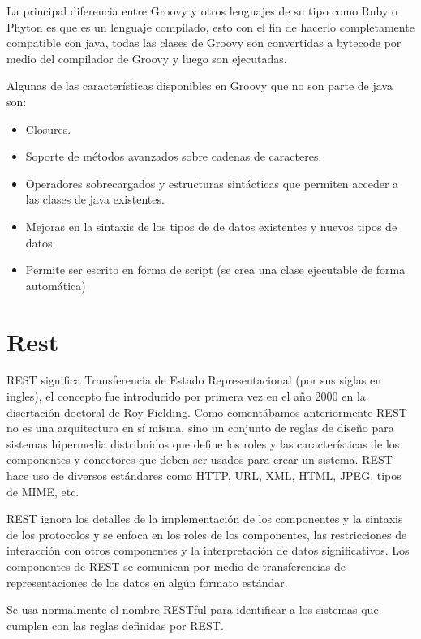 \documentclass[12pt,a4paper,spanish,openany]{book}
\begin{document}
La principal diferencia entre Groovy y otros lenguajes de su tipo como Ruby
o Phyton es que es un lenguaje compilado, esto con el fin de hacerlo
completamente compatible con java, todas las clases de Groovy son convertidas a
bytecode por medio del compilador de Groovy y luego son ejecutadas.

Algunas de las características disponibles en Groovy que no son parte de java
son:

\begin{itemize}
  \item Closures.
  \item Soporte de métodos avanzados sobre cadenas de caracteres.
  \item Operadores sobrecargados y estructuras sintácticas que permiten acceder
  a las clases de java existentes.
  \item Mejoras en la sintaxis de los tipos de de datos existentes y nuevos tipos
  de datos.
 \item Permite ser escrito en forma de script (se crea una clase ejecutable de
 forma automática)
\end{itemize}


\section{Rest}

REST significa  Transferencia de Estado Representacional (por sus siglas en
ingles), el concepto fue introducido por primera vez en el año 2000 en la
disertación doctoral de Roy Fielding. Como comentábamos anteriormente REST no es
una arquitectura en sí misma, sino un conjunto de reglas de diseño para
sistemas hipermedia distribuidos que define los roles y las características  de
los componentes y conectores que deben ser usados para crear un sistema.
REST hace uso de diversos estándares como HTTP, URL, XML, HTML, JPEG, tipos de
MIME, etc.

REST ignora los detalles de la implementación de los componentes y la sintaxis
de los protocolos y se enfoca en los roles de los componentes, las restricciones
de interacción con otros componentes y la interpretación de datos
significativos. Los componentes de REST se comunican por medio de transferencias
de representaciones de los datos en algún formato estándar.

Se usa normalmente el nombre RESTful para identificar a los sistemas que cumplen
con las reglas definidas por REST.
\end{document}
